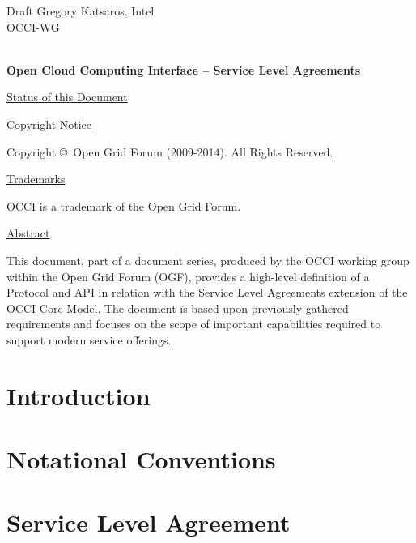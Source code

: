\documentclass[10pt,a4paper]{article}
\begin{document}
\thispagestyle{empty}

Draft \hfill  Gregory Katsaros, Intel\\
OCCI-WG \hfill  \\
\rightline {\today}\\

\vspace*{0.5in}

\begin{Large}
\textbf{Open Cloud Computing Interface -- Service Level Agreements}
\end{Large}

\vspace*{0.5in}

\underline{Status of this Document}



\underline{Copyright Notice}

Copyright \copyright ~Open Grid Forum (2009-2014). All Rights
Reserved.

\underline{Trademarks}

OCCI is a trademark of the Open Grid Forum.

\underline{Abstract}



This document, part of a document series, produced by the OCCI working group within the Open Grid Forum (OGF), provides a high-level definition of a Protocol and API in relation with the Service Level Agreements extension of the OCCI Core Model. The document is based upon previously gathered requirements and focuses on the scope of important capabilities required to support modern service offerings.

\newpage
\tableofcontents
\newpage

\section{Introduction}



\section{Notational Conventions}



\section{Service Level Agreement}
\end{document}
